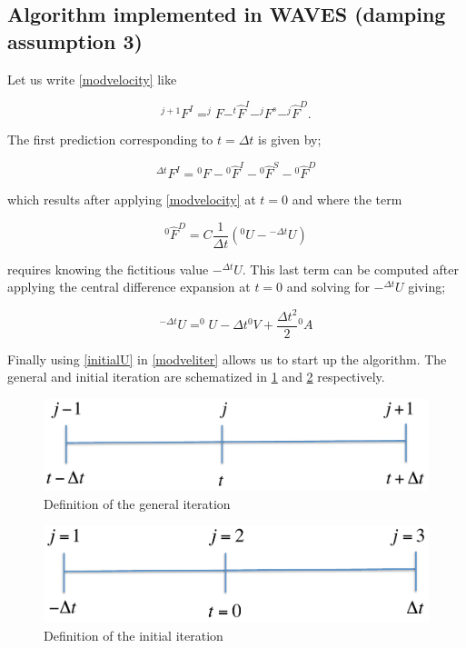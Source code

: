 \documentclass[12pt,letterpaper]{article}
\begin{document}
\subsection*{Algorithm implemented in {\bf WAVES} (damping assumption 3)}

Let us write \cref{modvelocity} like

\begin{equation}
^{j+1}F^I=^{j}F-^t\hat {F}^I-^{j}F^s-^j\hat {F}^D.
\label{modveliter}
\end{equation}

The first prediction corresponding to $t=\Delta t$ is given by;



\[{}^{\Delta t}{F^I} = {}^0F - {}^0{{\hat F}^I} - {}^0{{\hat F}^S} - {}^0{{\hat F}^D}\]

which results after applying \cref{modvelocity} at $t=0$ and where the term

\[{}^0{{\hat F}^D} = C\frac{1}{{\Delta t}}\left( {{}^0U - {}^{ - \Delta t}U} \right)\]

requires knowing the fictitious value $-^{\Delta t}U$. This last term can be computed after applying the central difference expansion at $t=0$ and solving for $-^{\Delta t}U$ giving;

\begin{equation}
^{-\Delta t}U=^{0}U-\Delta t ^{0}V+\dfrac{\Delta t^2}{2} {^{0}A}
\label{initialU}
\end{equation}

Finally using \cref{initialU} in \cref{modveliter} allows us to start up the algorithm. The general and initial iteration are schematized in \cref{fig:general iteration} and \cref{fig:initial iteration} respectively.

\begin{figure}[H]
\centering
\includegraphics[width=12cm]{IMAGES/figure5.pdf}
\caption{Definition of the general iteration}
\label{fig:general iteration}
\end{figure}

\begin{figure}[H]
\centering
\includegraphics[width=12cm]{IMAGES/figure6.pdf}
\caption{Definition of the initial iteration}
\label{fig:initial iteration}
\end{figure}
\end{document}

